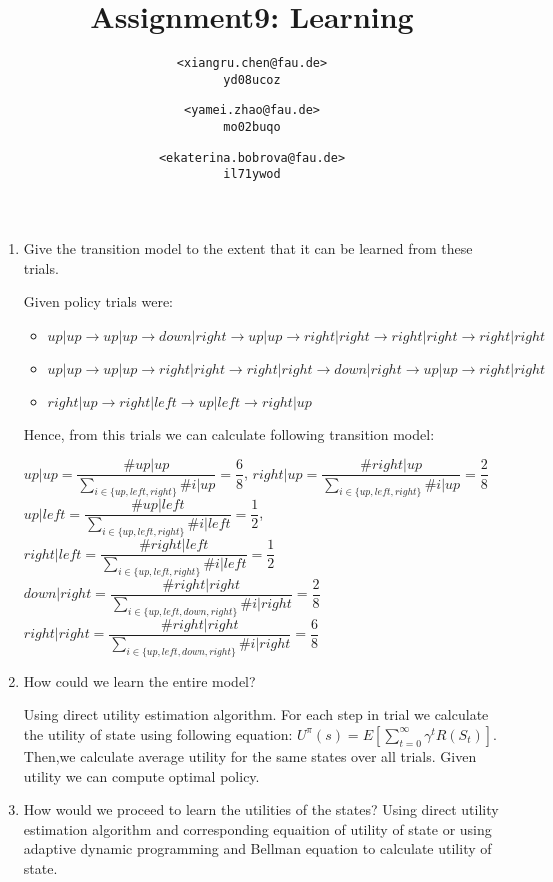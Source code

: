 \documentclass{homework}
\title{Assignment9: Learning}
\author{
  \texttt{<xiangru.chen@fau.de>} \\
  \texttt{yd08ucoz}
  \and
  \texttt{<yamei.zhao@fau.de>}\\
  \texttt{mo02buqo}
  \and
  \texttt{<ekaterina.bobrova@fau.de>}\\
  \texttt{il71ywod}
}
\begin{document}
\maketitle

\begin{enumerate}
	\item Give the transition model to the extent that it can be learned from these trials.

	Given policy trials were:
	\begin{itemize}
		\item $up|up \rightarrow up|up \rightarrow down|right \rightarrow up|up \rightarrow right|right \rightarrow right|right \rightarrow right|right$
		\item $up|up \rightarrow up|up \rightarrow right|right \rightarrow right|right \rightarrow down|right \rightarrow up|up \rightarrow right|right$
		\item $right|up \rightarrow right|left \rightarrow up|left \rightarrow right|up$
	\end{itemize}
	Hence, from this trials we can calculate following transition model:

			$up|up = \dfrac{\# up|up}{\sum_{i\in\{up,left,right\}}\# i|up} = \dfrac{6}{8}$,\newline
			$right|up = \dfrac{\# right|up}{\sum_{i\in\{up,left,right\}}\# i|up} = \dfrac{2}{8}$\newline
			$up|left = \dfrac{\# up|left}{\sum_{i\in\{up,left,right\}}\# i|left} = \dfrac{1}{2}$,\newline
			$right|left = \dfrac{\# right|left}{\sum_{i\in\{up,left,right\}}\# i|left} = \dfrac{1}{2}$\newline
			$down|right = \dfrac{\# right|right}{\sum_{i\in\{up,left,down,right\}}\# i|right} = \dfrac{2}{8}$\newline
			$right|right = \dfrac{\# right|right}{\sum_{i\in\{up,left,down,right\}}\# i|right} = \dfrac{6}{8}$\newline

	\item How could we learn the entire model?

		Using direct utility estimation algorithm.  For each step in trial we calculate the utility of state using following equation: $U^\pi(s)=E[\sum_{t=0}^\infty \gamma^tR(S_t)]$. Then,we calculate average utility for the same states over all trials. Given utility we can compute optimal policy.
	\item How would we proceed to learn the utilities of the states?
		Using direct utility estimation algorithm and corresponding equaition of utility of state or using adaptive dynamic programming and Bellman equation to calculate utility of state.
\end{enumerate}
\end{document}
